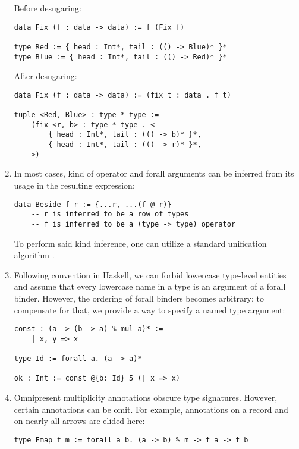 \documentclass[a4paper,14pt]{extreport}
\begin{document}
\begin{enumerate}
        Before desugaring:
\begin{verbatim}
data Fix (f : data -> data) := f (Fix f)

type Red := { head : Int*, tail : (() -> Blue)* }*
type Blue := { head : Int*, tail : (() -> Red)* }*
\end{verbatim}
        After desugaring:
\begin{verbatim}
data Fix (f : data -> data) := (fix t : data . f t)

tuple <Red, Blue> : type * type :=
    (fix <r, b> : type * type . <
        { head : Int*, tail : (() -> b)* }*,
        { head : Int*, tail : (() -> r)* }*,
    >)
\end{verbatim}
    \item In most cases, kind of operator and forall arguments can be inferred
        from its usage in the resulting expression:
\begin{verbatim}
data Beside f r := {...r, ...(f @ r)}
    -- r is inferred to be a row of types
    -- f is inferred to be a (type -> type) operator
\end{verbatim}
        To perform said kind inference, one can utilize a standard unification
        algorithm \cite{milner}.
    \item Following convention in Haskell, we can forbid lowercase type-level
        entities and assume that every lowercase name in a type is an argument
        of a forall binder. However, the ordering of forall binders becomes
        arbitrary; to compensate for that, we provide a way to specify a named
        type argument:
\begin{verbatim}
const : (a -> (b -> a) % mul a)* :=
    | x, y => x

type Id := forall a. (a -> a)*

ok : Int := const @{b: Id} 5 (| x => x)
\end{verbatim}
    \item Omnipresent multiplicity annotations obscure type signatures.
        However, certain annotations can be omit. For example, annotations on a
        record and on nearly all arrows are elided here:
\begin{verbatim}
type Fmap f m := forall a b. (a -> b) % m -> f a -> f b


\end{verbatim}
\end{enumerate}
\end{document}

